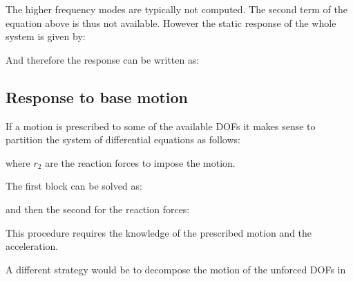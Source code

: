 \documentclass[10pt,a4paper]{scrartcl}
\begin{document}
\begin{multicols*}{2}
The higher frequency modes are typically not computed. The second term of the equation above is thus not available. However the static response of the whole system is given by:


And therefore the response can be written as:


\subsection{Response to base motion}

If a motion is prescribed to some of the available DOFs it makes sense to partition the system of differential equations as follows:


where $r_2$ are the reaction forces to impose the motion.

The first block can be solved as:


and then the second for the reaction forces:


This procedure requires the knowledge of the prescribed motion and the acceleration.

A different strategy would be to decompose the motion of the unforced DOFs in


\end{multicols*}
\end{document}
